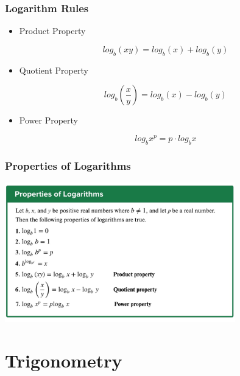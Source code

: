 \documentclass{beamer}
\begin{document}
\begin{frame}\frametitle{Logarithm Rules}
\begin{itemize}
\item Product Property

\begin{equation}
log_b(xy) = log_b(x) + log_b(y)
\end{equation}

\item Quotient Property

\begin{equation}
log_b(\frac{x}{y}) = log_b(x) - log_b(y)
\end{equation}

\item Power Property

\begin{equation}
log_b x^p = p \cdot log_b x
\end{equation}

\end{itemize}
\end{frame}


\begin{frame}\frametitle{Properties of Logarithms}
\begin{center}
\includegraphics[width=10cm]{fig/logprop.jpg}
\end{center}
\end{frame}

\section{Trigonometry}
\end{document}
